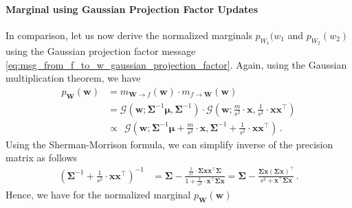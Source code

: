 \documentclass[a4paper]{article}
\newcommand{\Gauss}[3]{{\mathcal G} \left({#1};{#2},{#3}\right)}
\newcommand{\bs}[1]{{\boldsymbol{#1}}}
\newcommand{\transpose}[1]{{#1}^\top}
\theoremstyle{definition}
\begin{document}
\paragraph{Marginal using Gaussian Projection Factor Updates} In comparison, let us now derive the normalized marginals $p_{W_1}(w_1$ and $p_{W_2}(w_2)$ using the Gaussian projection factor message \eqref{eq:msg_from_f_to_w_gaussian_projection_factor}. Again, using the Gaussian multiplication theorem, we have
\begin{align*}
    p_{\bs{W}}(\bs{w}) & = m_{\bs{W} \to f}(\bs{w}) \cdot m_{f \to \bs{W}}(\bs{w}) \\
    & = \Gauss{\bs{w}}{\bs{\Sigma}^{-1} \bs{\mu}}{\bs{\Sigma}^{-1}} \cdot \Gauss{\bs{w}}{\frac{m}{s^2} \cdot \bs{x}}{\frac{1}{s^2} \cdot \bs{x}\transpose{\bs{x}}} \\
    & \propto \ \ \Gauss{\bs{w}}{\bs{\Sigma}^{-1} \bs{\mu} + \frac{m}{s^2} \cdot \bs{x}}{\bs{\Sigma}^{-1} + \frac{1}{s^2} \cdot \bs{x}\transpose{\bs{x}}} \,.
\end{align*}
Using the Sherman-Morrison formula, we can simplify inverse of the precision matrix as follows
\begin{align*}
    \left( \bs{\Sigma}^{-1} + \frac{1}{s^2} \cdot \bs{x}\transpose{\bs{x}} \right)^{-1} 
    & = \bs{\Sigma} - \frac{\frac{1}{s^2} \cdot \bs{\Sigma}\bs{x}\transpose{\bs{x}}\bs{\Sigma}}{1 + \frac{1}{s^2} \cdot \transpose{\bs{x}} \bs{\Sigma} \bs{x}} 
    = \bs{\Sigma} - \frac{\bs{\Sigma}\bs{x} \transpose{\left( \bs{\Sigma}\bs{x} \right)}}{s^2 + \transpose{\bs{x}} \bs{\Sigma} \bs{x}} \,.
\end{align*}
Hence, we have for the normalized marginal $p_{\bs{W}}(\bs{w})$
\end{document}
